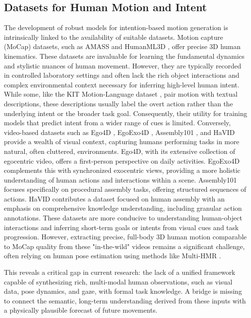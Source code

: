 \documentclass[biomimetics,article,submit,pdftex,moreauthors]{Definitions/mdpi}
\begin{document}
\subsection{Datasets for Human Motion and Intent}
The development of robust models for intention-based motion generation is intrinsically linked to the availability of suitable datasets.
Motion capture (MoCap) datasets, such as AMASS \citep{AMASS} and HumanML3D \citep{Guo_2022_CVPR}, offer precise 3D human kinematics.
These datasets are invaluable for learning the fundamental dynamics and stylistic nuances of human movement.
However, they are typically recorded in controlled laboratory settings and often lack the rich object interactions and complex environmental context necessary for inferring high-level human intent.
While some, like the KIT Motion-Language dataset \citep{Plappert2016}, pair motion with textual descriptions, these descriptions usually label the overt action rather than the underlying intent or the broader task goal.
Consequently, their utility for training models that predict intent from a wider range of cues is limited.
Conversely, video-based datasets such as Ego4D \citep{Grauman2021}, EgoExo4D \citep{egoexo}, Assembly101 \citep{assembly101}, and HaVID \citep{havid} provide a wealth of visual context, capturing humans performing tasks in more natural, often cluttered, environments.
Ego4D, with its extensive collection of egocentric video, offers a first-person perspective on daily activities.
EgoExo4D complements this with synchronized exocentric views, providing a more holistic understanding of human actions and interactions within a scene.
Assembly101 focuses specifically on procedural assembly tasks, offering structured sequences of actions.
HaVID \citep{havid} contributes a dataset focused on human assembly with an emphasis on comprehensive knowledge understanding, including granular action annotations.
These datasets are more conducive to understanding human-object interactions and inferring short-term goals or intents from visual cues and task progression.
However, extracting precise, full-body 3D human motion comparable to MoCap quality from these "in-the-wild" videos remains a significant challenge, often relying on human pose estimation using methods like Multi-HMR \citep{multi-hmr2024}.

This reveals a critical gap in current research: the lack of a unified framework capable of synthesizing rich, multi-modal human observations, such as visual data, pose dynamics, and gaze, with formal task knowledge. A bridge is missing to connect the semantic, long-term understanding derived from these inputs with a physically plausible forecast of future movements.
\end{document}
